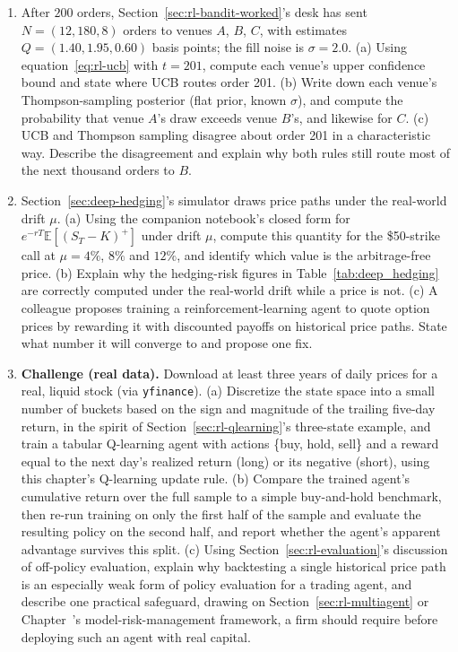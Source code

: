 \documentclass[../ai_in_finance]{subfiles}
\begin{document}
\begin{enumerate}[exercises]
    \item After $200$ orders, Section~\ref{sec:rl-bandit-worked}'s desk has sent $N=(12, 180, 8)$ orders to venues $A$, $B$, $C$, with estimates $Q=(1.40, 1.95, 0.60)$ basis points; the fill noise is $\sigma=2.0$. (a) Using equation~\eqref{eq:rl-ucb} with $t=201$, compute each venue's upper confidence bound and state where UCB routes order 201. (b) Write down each venue's Thompson-sampling posterior (flat prior, known $\sigma$), and compute the probability that venue $A$'s draw exceeds venue $B$'s, and likewise for $C$. (c) UCB and Thompson sampling disagree about order 201 in a characteristic way. Describe the disagreement and explain why both rules still route most of the next thousand orders to $B$.
    \item Section~\ref{sec:deep-hedging}'s simulator draws price paths under the real-world drift $\mu$. (a) Using the companion notebook's closed form for $e^{-rT}\mathbb{E}[(S_T-K)^+]$ under drift $\mu$, compute this quantity for the \$50-strike call at $\mu=4\%$, $8\%$ and $12\%$, and identify which value is the arbitrage-free price. (b) Explain why the hedging-risk figures in Table~\ref{tab:deep_hedging} are correctly computed under the real-world drift while a price is not. (c) A colleague proposes training a reinforcement-learning agent to quote option prices by rewarding it with discounted payoffs on historical price paths. State what number it will converge to and propose one fix.
    \item \textbf{Challenge (real data).} Download at least three years of daily prices for a real, liquid stock (via \texttt{yfinance}). (a) Discretize the state space into a small number of buckets based on the sign and magnitude of the trailing five-day return, in the spirit of Section~\ref{sec:rl-qlearning}'s three-state example, and train a tabular Q-learning agent with actions \{buy, hold, sell\} and a reward equal to the next day's realized return (long) or its negative (short), using this chapter's Q-learning update rule. (b) Compare the trained agent's cumulative return over the full sample to a simple buy-and-hold benchmark, then re-run training on only the first half of the sample and evaluate the resulting policy on the second half, and report whether the agent's apparent advantage survives this split. (c) Using Section~\ref{sec:rl-evaluation}'s discussion of off-policy evaluation, explain why backtesting a single historical price path is an especially weak form of policy evaluation for a trading agent, and describe one practical safeguard, drawing on Section~\ref{sec:rl-multiagent} or Chapter~'s model-risk-management framework, a firm should require before deploying such an agent with real capital.
\end{enumerate}
\end{document}
